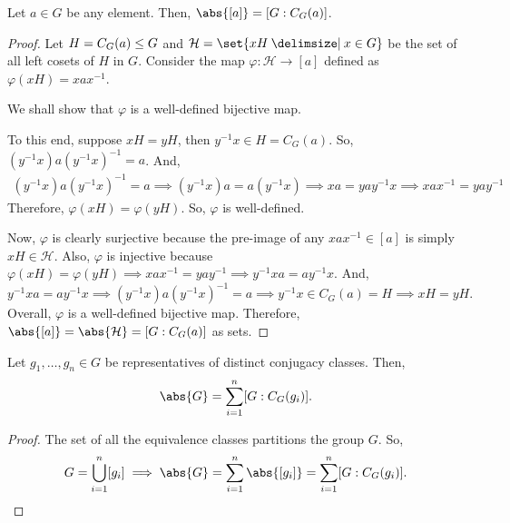 \documentclass[11pt]{penrose}
\begin{document}
\begin{nthm}
    Let $a \in G$ be any element. Then, $\abs{[a]} = [G : C_{G}(a)]$.
\end{nthm}
\begin{proof}
    Let $H = C_{G}(a) \mathrel{\leq} G$ and $\mathcal{H} = \set{xH \st x \in G}$ be the set of all left cosets of $H$ in $G$. Consider the map $\varphi : \mathcal{H} \to [a]$ defined as $\varphi(xH) = x a x^{-1}$.

    We shall show that $\varphi$ is a well-defined bijective map.

    To this end, suppose $xH = yH$, then $y^{-1} x \in H = C_{G}(a)$. So, $(y^{-1} x) a (y^{-1} x)^{-1} = a$. And,
    \begin{align*}
        (y^{-1} x) a (y^{-1} x)^{-1} = a
        \implies
        (y^{-1} x) a = a (y^{-1} x)
        \implies
        xa = yay^{-1} x
        \implies
        xax^{-1} = yay^{-1}
    \end{align*}
    Therefore, $\varphi(xH) = \varphi(yH)$. So, $\varphi$ is well-defined.

    Now, $\varphi$ is clearly surjective because the pre-image of any $x a x^{-1} \in [a]$ is simply $xH \in \mathcal{H}$. Also, $\varphi$ is injective because $\varphi(xH) = \varphi(yH) \implies xax^{-1} = yay^{-1} \implies y^{-1} x a = a y^{-1} x$. And,
    \begin{equation*}
        y^{-1} x a = a y^{-1} x
        \implies
        (y^{-1} x) a (y^{-1} x)^{-1} = a
        \implies
        y^{-1} x \in C_{G}(a) = H
        \implies
        xH = yH.
    \end{equation*}
    Overall, $\varphi$ is a well-defined bijective map. Therefore, $\abs{ [a] } = \abs{ \mathcal{H} } = [G : C_{G}(a)]$ as sets.
\end{proof}

\begin{nthm}
    Let $g_{1}, \dots, g_{n} \in G$ be representatives of distinct conjugacy classes. Then,
    \begin{equation*}
        \abs{G} = \sum_{i=1}^{n} [G : C_{G}(g_{i})].
    \end{equation*}
\end{nthm}
\begin{proof}
    The set of all the equivalence classes partitions the group $G$. So,
    \begin{equation*}
        G = \bigcup_{i = 1}^{n} [g_{i}]
        \implies \abs{G} = \sum_{i = 1}^{n} \abs{[g_{i}]} = \sum_{i = 1}^{n} [G : C_{G}(g_{i})].
        \qedhere
    \end{equation*}
\end{proof}
\end{document}
